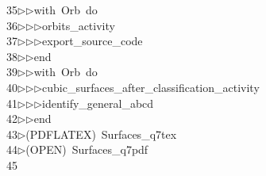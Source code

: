 \begin{tabbing}
35\>$\triangleright$\>$\triangleright$\>with\ Orb\ do\ \\[0pt]
36\>$\triangleright$\>$\triangleright$\>$\triangleright$\>orbits\_activity\ \\[0pt]
37\>$\triangleright$\>$\triangleright$\>$\triangleright$\>export\_source\_code\ \\[0pt]
38\>$\triangleright$\>$\triangleright$\>end\ \\[0pt]
39\>$\triangleright$\>$\triangleright$\>with\ Orb\ do\ \\[0pt]
40\>$\triangleright$\>$\triangleright$\>$\triangleright$\>cubic\_surfaces\_after\_classification\_activity\ \\[0pt]
41\>$\triangleright$\>$\triangleright$\>$\triangleright$\>identify\_general\_abcd\ \\[0pt]
42\>$\triangleright$\>$\triangleright$\>end\\[0pt]
43\>$\triangleright$\>(PDFLATEX)\ Surfaces\_q7tex\ \\[0pt]
44\>$\triangleright$\>(OPEN)\ Surfaces\_q7pdf\\[0pt]
45\>\end{tabbing}
